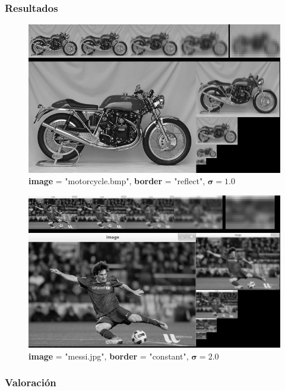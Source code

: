 \documentclass{article}
\begin{document}
\subsubsection{Resultados}
\begin{figure}[hbt!]
	\centering
	\includegraphics[width=1.\textwidth]{assets/ex1-A/gp-reflects-1.jpg}
	\caption{\textbf{image} = "motorcycle.bmp", \textbf{border} = "reflect", $\boldsymbol{\sigma} = 1.0$}
\end{figure}
\begin{figure}[hbt!]
	\centering
	\includegraphics[width=1.\textwidth]{assets/ex1-A/gp-constant-s2.jpg}
	\caption{\textbf{image} = "messi.jpg", \textbf{border} = "constant", $\boldsymbol{\sigma} = 2.0$}
\end{figure}

\newpage

\subsubsection{Valoración}
\end{document}
